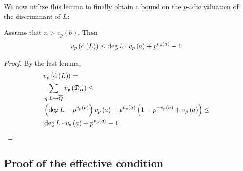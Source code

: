 \documentclass[../main.tex]{subfiles}
\begin{document}
We now utilize this lemma to finally obtain a bound on the $p$-adic valuation of the discriminant of $L$:
\begin{corollary}
  \label{prop:discriminant_bound}
  Assume that $n > v_p\left( b \right)$.
  Then
  \[
    v_p\left( \operatorname{\rm d}\left( L \right) \right) \leq 
    \deg L \cdot v_p\left( a \right) + p^{v_p\left( a \right)} - 1
  \]
\end{corollary}
\begin{proof}
  By the last lemma,  
  \begin{align*}
    & v_p\left( \operatorname{\rm d}\left( L \right) \right) = \\
    &  \sum_{\eta: L \hookrightarrow \overline{Q}} v_p\left( \mathfrak{D}_\alpha \right) \leq \\
    & \left( \deg L - p^{v_p\left( a \right)} \right)v_p\left( a \right) + 
    p^{v_p\left( a \right)} \left( 1 - p^{-v_p\left( a \right)} + v_p\left( a \right) \right) \leq \\
    & \deg L \cdot v_p\left( a \right) + p^{v_p\left( a \right)} - 1
  \end{align*}
\end{proof}


\subsection{Proof of the effective condition}
\end{document}
